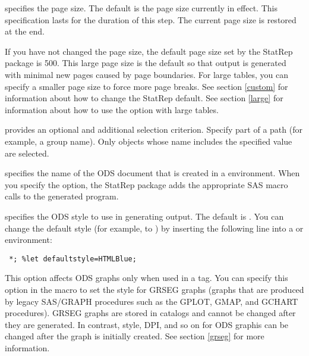 \documentclass[article,oneside]{memoir}
\newcommand*{\StatRep}{\textsf{StatRep}\xspace}
\begin{document}
\begin{description}
\begin{description}
  \end{description}
    
  \item[\Code{pagesize=}] specifies the page size. The default is the page size currently in effect. 
  This specification lasts for the 
  duration of this step. The current page size is restored at the end.
  
  If you have not changed the page size, the default page size set by the \StatRep 
  package is 500. This large page size is the default so that output is generated with
  minimal new pages caused by page boundaries. For large tables, you can specify a smaller
  page size to force more page breaks. See section \ref{custom} for information about
  how to change the \StatRep default. See section \ref{large} for information about how
  to use the  option with large tables.

  \item[\Code{pattern=}] provides an optional and additional selection criterion.
  Specify part of a path (for example, a group name). 
  Only objects whose name includes the specified value are selected. 

    \item[\Code{store=}] specifies the name of the ODS document that is created in a 
      environment. When you specify the  option,
     the \StatRep package adds the appropriate SAS macro calls to the 
     generated program. 
     
  \item[\Code{style=}] specifies the ODS style to use in generating output. 
    The default is \mbox{}. You can change the default style 
    (for example, to ) by inserting the following line into a 
    or  environment:

\begin{snugshade}
\begin{verbatim} 
 *; %let defaultstyle=HTMLBlue;
\end{verbatim}
\end{snugshade}
    
    This option affects ODS graphs only when used in a  tag.
    You can specify this option in the  macro to set the style 
    for GRSEG graphs (graphs that are produced by legacy SAS/GRAPH
    procedures such as the GPLOT, GMAP, and GCHART procedures). 
    GRSEG graphs are stored in catalogs
    and cannot be changed after they are generated. In contrast, 
    style, DPI, and so on for ODS graphis can be changed after the graph is initially created.
    See section \ref{grseg} for more information.


\end{description}
\end{document}
